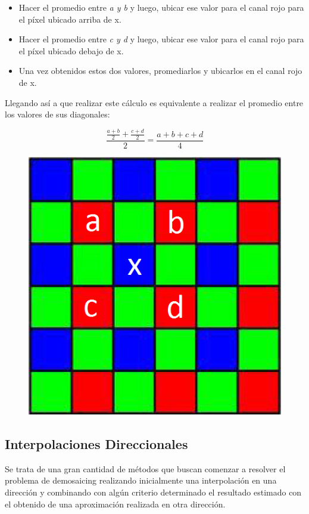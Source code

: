 \documentclass[a4paper]{article}
\begin{document}
\begin{itemize}
 
\item Hacer el promedio entre \textit{a y b} y luego, ubicar ese valor para el canal rojo para el p\'ixel ubicado arriba de x.

\item Hacer el promedio entre \textit{c y d} y luego, ubicar ese valor para el canal rojo para el p\'ixel ubicado debajo de x.

\item Una vez obtenidos estos dos valores, promediarlos y ubicarlos en el canal rojo de x.\\
\end{itemize}
Llegando as\'i a que realizar este c\'alculo es equivalente a realizar el promedio entre los valores de sus diagonales:

\[
 \frac{\frac{a+b}{2} + \frac{c+d}{2}}{2} = \frac{a+b+c+d}{4}
\]

\begin{figure}[h!]
	\caption{}
	\begin{center}
	\includegraphics[scale=0.36]{imagenes/bilineal}
	\label{bilineal}
  \end{center}
\end{figure}

\newpage
\subsection{Interpolaciones Direccionales}
Se trata de una gran cantidad de métodos que buscan comenzar a resolver el problema de demosaicing realizando inicialmente una interpolación en una dirección y combinando con algún criterio determinado el resultado estimado con el obtenido de una aproximación realizada en otra dirección.\\
\end{document}
